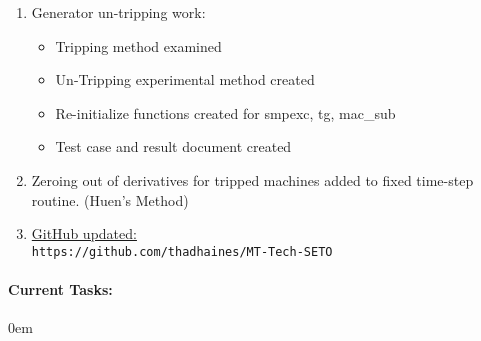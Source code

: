 \documentclass[12pt]{article}
\begin{document}
\begin{multicols}{2}
\begin{comment}
\end{comment}
	\begin{enumerate}
		\item Generator un-tripping work:
			\begin{itemize}
				 em
				\footnotesize
				\item Tripping method examined
				\item Un-Tripping experimental method created
				\item Re-initialize functions created for smpexc, tg, mac\_sub
				\item Test case and result document created
			\end{itemize}
		\item Zeroing out of derivatives for tripped machines added to fixed time-step routine. (Huen's Method)

		

		
	
		\item \href{https://github.com/thadhaines/MT-Tech-SETO}{GitHub updated:}\\
	{\footnotesize \verb|https://github.com/thadhaines/MT-Tech-SETO| }\\
	\end{enumerate}

\paragraph{Current Tasks:}
\begin{enumerate}
	\itemsep 0em 
		

\end{enumerate}
\end{multicols}
\end{document}
